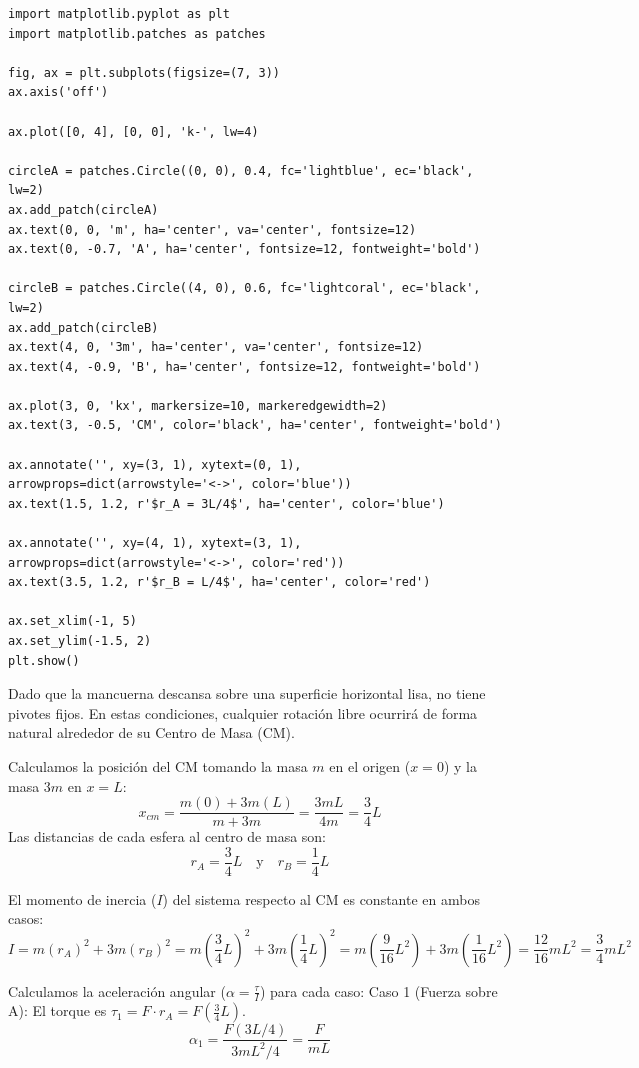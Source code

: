 \documentclass[12pt, a4paper]{article}
\begin{document}
\begin{verbatim}
import matplotlib.pyplot as plt
import matplotlib.patches as patches

fig, ax = plt.subplots(figsize=(7, 3))
ax.axis('off')

ax.plot([0, 4], [0, 0], 'k-', lw=4)

circleA = patches.Circle((0, 0), 0.4, fc='lightblue', ec='black', lw=2)
ax.add_patch(circleA)
ax.text(0, 0, 'm', ha='center', va='center', fontsize=12)
ax.text(0, -0.7, 'A', ha='center', fontsize=12, fontweight='bold')

circleB = patches.Circle((4, 0), 0.6, fc='lightcoral', ec='black', lw=2)
ax.add_patch(circleB)
ax.text(4, 0, '3m', ha='center', va='center', fontsize=12)
ax.text(4, -0.9, 'B', ha='center', fontsize=12, fontweight='bold')

ax.plot(3, 0, 'kx', markersize=10, markeredgewidth=2)
ax.text(3, -0.5, 'CM', color='black', ha='center', fontweight='bold')

ax.annotate('', xy=(3, 1), xytext=(0, 1), arrowprops=dict(arrowstyle='<->', color='blue'))
ax.text(1.5, 1.2, r'$r_A = 3L/4$', ha='center', color='blue')

ax.annotate('', xy=(4, 1), xytext=(3, 1), arrowprops=dict(arrowstyle='<->', color='red'))
ax.text(3.5, 1.2, r'$r_B = L/4$', ha='center', color='red')

ax.set_xlim(-1, 5)
ax.set_ylim(-1.5, 2)
plt.show()
\end{verbatim}

Dado que la mancuerna descansa sobre una superficie horizontal lisa, no tiene pivotes fijos. En estas condiciones, cualquier rotación libre ocurrirá de forma natural alrededor de su Centro de Masa (CM).

Calculamos la posición del CM tomando la masa $m$ en el origen ($x=0$) y la masa $3m$ en $x=L$:
$$x_{cm} = \frac{m(0) + 3m(L)}{m + 3m} = \frac{3mL}{4m} = \frac{3}{4}L$$
Las distancias de cada esfera al centro de masa son:
$$r_A = \frac{3}{4}L \quad \text{y} \quad r_B = \frac{1}{4}L$$

El momento de inercia ($I$) del sistema respecto al CM es constante en ambos casos:
$$I = m(r_A)^2 + 3m(r_B)^2 = m\left(\frac{3}{4}L\right)^2 + 3m\left(\frac{1}{4}L\right)^2 = m\left(\frac{9}{16}L^2\right) + 3m\left(\frac{1}{16}L^2\right) = \frac{12}{16}mL^2 = \frac{3}{4}mL^2$$

Calculamos la aceleración angular ($\alpha = \frac{\tau}{I}$) para cada caso:
Caso 1 (Fuerza sobre A): El torque es $\tau_1 = F \cdot r_A = F\left(\frac{3}{4}L\right)$.
$$\alpha_1 = \frac{F(3L/4)}{3mL^2/4} = \frac{F}{mL}$$
\end{document}
